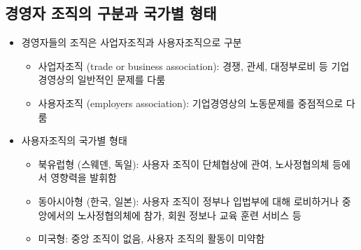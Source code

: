 \documentclass[aspectratio=169,xcolor=dvipsnames,handout]{beamer}
\begin{document}
\subsection{경영자 조직의 구분과 국가별 형태}

\begin{frame}{}
    \begin{itemize}[<+->]
        \item 경영자들의 조직은 사업자조직과 사용자조직으로 구분
        \begin{itemize}[<+->]
            \item 사업자조직 (trade or business association): 경쟁, 관세, 대정부로비 등 기업경영상의 일반적인 문제를 다룸
            \item 사용자조직 (employers association): 기업경영상의 노동문제를 중점적으로 다룸
        \end{itemize}
        \item 사용자조직의 국가별 형태
        \begin{itemize}[<+->]
        \item 북유럽형 (스웨덴, 독일): 사용자 조직이 단체협상에 관여, 노사정협의체 등에서 영향력을 발휘함
        \item 동아시아형 (한국, 일본): 사용자 조직이 정부나 입법부에 대해 로비하거나 중앙에서의 노사정협의체에 참가, 회원 정보나 교육 훈련 서비스 등
        \item 미국형: 중앙 조직이 없음, 사용자 조직의 활동이 미약함
        \end{itemize}
    \end{itemize}
\end{frame}
\end{document}
